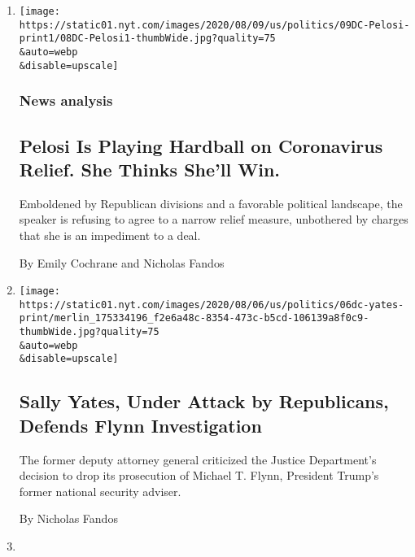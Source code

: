 \begin{enumerate}
\def\labelenumi{\arabic{enumi}.}
\item
  \href{/2020/08/08/us/politics/nancy-pelosi-coronavirus-relief.html}{}

  \texttt{[image: https://static01.nyt.com/images/2020/08/09/us/politics/09DC-Pelosi-print1/08DC-Pelosi1-thumbWide.jpg?quality=75\\\&auto=webp\\\&disable=upscale]}

  \hypertarget{news-analysis}{%
  \subsubsection{News analysis}\label{news-analysis}}

  \hypertarget{pelosi-is-playing-hardball-on-coronavirus-relief-she-thinks-shell-win}{%
  \subsection{Pelosi Is Playing Hardball on Coronavirus Relief. She
  Thinks She'll
  Win.}\label{pelosi-is-playing-hardball-on-coronavirus-relief-she-thinks-shell-win}}

  Emboldened by Republican divisions and a favorable political
  landscape, the speaker is refusing to agree to a narrow relief
  measure, unbothered by charges that she is an impediment to a deal.

  By Emily Cochrane and Nicholas Fandos
\item
  \href{/2020/08/05/us/politics/sally-yates-flynn-investigation.html}{}

  \texttt{[image: https://static01.nyt.com/images/2020/08/06/us/politics/06dc-yates-print/merlin\_175334196\_f2e6a48c-8354-473c-b5cd-106139a8f0c9-thumbWide.jpg?quality=75\\\&auto=webp\\\&disable=upscale]}

  \hypertarget{sally-yates-under-attack-by-republicans-defends-flynn-investigation}{%
  \subsection{Sally Yates, Under Attack by Republicans, Defends Flynn
  Investigation}\label{sally-yates-under-attack-by-republicans-defends-flynn-investigation}}

  The former deputy attorney general criticized the Justice Department's
  decision to drop its prosecution of Michael T. Flynn, President
  Trump's former national security adviser.

  By Nicholas Fandos
\item
  \href{/2020/08/05/us/politics/cori-bush-missouri-william-lacy-clay.html}{}


\end{enumerate}
